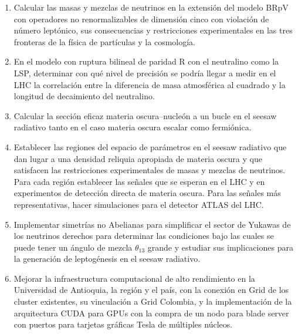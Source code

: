 \begin{enumerate}
\item 
\begin{bbrpvlhc}
  Calcular las masas y mezclas de neutrinos en la extensión del modelo
  BRpV con operadores no renormalizables de dimensión cinco con
  violación de número leptónico, sus consecuencias y restricciones
  experimentales en las tres fronteras de la física de partículas y la
  cosmología.
\end{bbrpvlhc}
\label{item:bbrpvlhc1}
\item 
\begin{brpvlhc}  
  En el modelo con ruptura bilineal de paridad R con el neutralino
  como la LSP, determinar con qué nivel de precisión se podría llegar
  a medir en el LHC la correlación entre la diferencia de masa
  atmosférica al cuadrado y la longitud de decaimiento del neutralino.
\end{brpvlhc}
\label{item:bbrpvlhc2}
\item 
\begin{darkmatter}
  Calcular la sección eficaz materia oscura--nucleón a un bucle en el
  seesaw radiativo tanto en el caso materia oscura escalar como
  fermiónica.
\end{darkmatter}

\item 
\begin{darkmatter}
  Establecer las regiones del espacio de parámetros en el seesaw
  radiativo que dan lugar a una densidad reliquia apropiada
  de materia oscura y que satisfacen las restricciones
  experimentales de masas y mezclas de neutrinos. Para cada región
  establecer las señales que se esperan en el LHC y en experimentos de
  detección directa de materia oscura.  Para las señales más
  representativas, hacer simulaciones para el detector ATLAS del LHC.
\end{darkmatter}
\label{item:darkmatter1}

\item 
\begin{darkmatter}
  Implementar simetrías no Abelianas para simplificar el sector de
  Yukawas de los neutrinos derechos para determinar las condiciones
  bajo las cuales se puede tener un ángulo de mezcla $\theta_{13}$
  grande y estudiar sus implicaciones para la generación de
  leptogénesis en el seesaw radiativo.
\end{darkmatter}
\label{item:darkmatter2}

\item Mejorar la infraestructura computacional de alto rendimiento en
  la Universidad de Antioquia, la región y el país, con la conexión en
  Grid de los cluster existentes, su vinculación a Grid Colombia, y la
  implementación de la arquitectura CUDA para GPUs con la compra de un
  nodo para blade server con puertos para tarjetas gráficas Tesla de
  múltiples núcleos.
\label{item:grid}
\end{enumerate}

